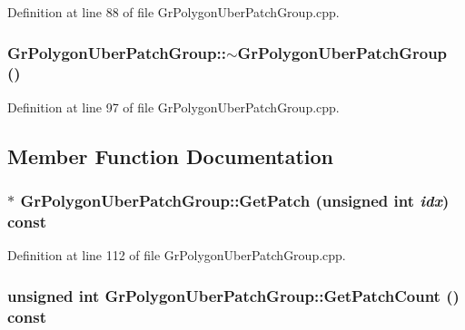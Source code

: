 Definition at line 88 of file GrPolygonUberPatchGroup.cpp.\hypertarget{class_gr_polygon_uber_patch_group_08541209e6759da168aaf6d007cb76c8}{
\subsubsection[{$\sim$GrPolygonUberPatchGroup}]{\setlength{\rightskip}{0pt plus 5cm}GrPolygonUberPatchGroup::$\sim$GrPolygonUberPatchGroup ()}}
\label{class_gr_polygon_uber_patch_group_08541209e6759da168aaf6d007cb76c8}




Definition at line 97 of file GrPolygonUberPatchGroup.cpp.

\subsection{Member Function Documentation}
\hypertarget{class_gr_polygon_uber_patch_group_f62a61e43ec4e84d4503880ae6c3dd45}{
\subsubsection[{GetPatch}]{ $\ast$ GrPolygonUberPatchGroup::GetPatch (unsigned int {\em idx}) const}}
\label{class_gr_polygon_uber_patch_group_f62a61e43ec4e84d4503880ae6c3dd45}




Definition at line 112 of file GrPolygonUberPatchGroup.cpp.\hypertarget{class_gr_polygon_uber_patch_group_3a68e3a29731c5084fcdee9c6982c706}{
\subsubsection[{GetPatchCount}]{\setlength{\rightskip}{0pt plus 5cm}unsigned int GrPolygonUberPatchGroup::GetPatchCount () const}}
\label{class_gr_polygon_uber_patch_group_3a68e3a29731c5084fcdee9c6982c706}





